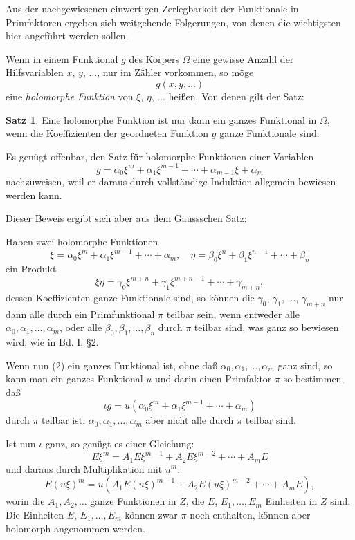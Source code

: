 \documentclass[12pt,a4paper]{article}
\theoremstyle{definition}
\newtheorem{satz}{Satz}[section]
\begin{document}
Aus der nachgewiesenen einwertigen Zerlegbarkeit der Funktionale in Primfaktoren ergeben sich weitgehende Folgerungen, von denen die wichtigsten hier angeführt werden sollen.

Wenn in einem Funktional $g$ des Körpers $\Omega$ eine gewisse Anzahl der Hilfsvariablen $x$, $y$, $\ldots$, nur im Zähler vorkommen, so möge
\[g(x, y, \ldots)\]
eine \emph{holomorphe Funktion} von $\xi$, $\eta$, $\ldots$ heißen. Von denen gilt der Satz:

\begin{satz}
Eine holomorphe Funktion ist nur dann ein ganzes Funktional in $\Omega$, wenn die Koeffizienten der geordneten Funktion $g$ ganze Funktionale sind.
\end{satz}

Es genügt offenbar, den Satz für holomorphe Funktionen einer Variablen
\begin{equation}
g = \alpha_0\xi^m + \alpha_1\xi^{m-1} + \cdots + \alpha_{m-1}\xi + \alpha_m
\end{equation}
nachzuweisen, weil er daraus durch vollständige Induktion allgemein bewiesen werden kann.

Dieser Beweis ergibt sich aber aus dem Gaussschen Satz:

Haben zwei holomorphe Funktionen
\[\xi = \alpha_0\xi^m + \alpha_1\xi^{m-1} + \cdots + \alpha_m, \quad \eta = \beta_0\xi^n + \beta_1\xi^{n-1} + \cdots + \beta_n\]
ein Produkt
\[\xi\eta = \gamma_0\xi^{m+n} + \gamma_1\xi^{m+n-1} + \cdots + \gamma_{m+n},\]
dessen Koeffizienten ganze Funktionale sind, so können die $\gamma_0$, $\gamma_1$, $\ldots$, $\gamma_{m+n}$ nur dann alle durch ein Primfunktional $\pi$ teilbar sein, wenn entweder alle $\alpha_0, \alpha_1, \ldots, \alpha_m$, oder alle $\beta_0, \beta_1, \ldots, \beta_n$ durch $\pi$ teilbar sind, was ganz so bewiesen wird, wie in Bd. I, \S 2.

Wenn nun (2) ein ganzes Funktional ist, ohne daß $\alpha_0, \alpha_1, \ldots, \alpha_m$ ganz sind, so kann man ein ganzes Funktional $u$ und darin einen Primfaktor $\pi$ so bestimmen, daß
\begin{equation}
\iota g = u(\alpha_0\xi^m + \alpha_1\xi^{m-1} + \cdots + \alpha_m)
\end{equation}
durch $\pi$ teilbar ist, $\alpha_0, \alpha_1, \ldots, \alpha_m$ aber nicht alle durch $\pi$ teilbar sind.

Ist nun $\iota$ ganz, so genügt es einer Gleichung:
\begin{equation}
E\xi^m = A_1E\xi^{m-1} + A_2E\xi^{m-2} + \cdots + A_mE
\end{equation}
und daraus durch Multiplikation mit $u^m$:
\begin{equation}
E(u\xi)^m = u(A_1E(u\xi)^{m-1} + A_2E(u\xi)^{m-2} + \cdots + A_mE),
\end{equation}
worin die $A_1, A_2, \ldots$ ganze Funktionen in $\tilde{Z}$, die $E$, $E_1, \ldots, E_m$ Einheiten in $\tilde{Z}$ sind. Die Einheiten $E$, $E_1, \ldots, E_m$ können zwar $\pi$ noch enthalten, können aber holomorph angenommen werden.
\end{document}
